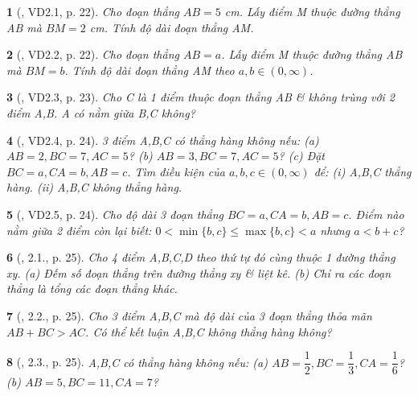 \documentclass{article}
\newtheorem{baitoan}{}
\begin{document}
\begin{baitoan}[\cite{TLCT_THCS_Toan_6_hinh_hoc}, VD2.1, p. 22]
	Cho đoạn thẳng $AB = 5$ {\rm cm}. Lấy điểm M thuộc đường thẳng AB mà $BM = 2$ {\rm cm}. Tính độ dài đoạn thẳng AM.
\end{baitoan}

\begin{baitoan}[\cite{TLCT_THCS_Toan_6_hinh_hoc}, VD2.2, p. 22]
	Cho đoạn thẳng $AB = a$. Lấy điểm M thuộc đường thẳng AB mà $BM = b$. Tính độ dài đoạn thẳng AM theo $a,b\in(0,\infty)$.
\end{baitoan}

\begin{baitoan}[\cite{TLCT_THCS_Toan_6_hinh_hoc}, VD2.3, p. 23]
	Cho C là 1 điểm thuộc đoạn thẳng AB \& không trùng với 2 điểm A,B. A có nằm giữa B,C không?
\end{baitoan}

\begin{baitoan}[\cite{TLCT_THCS_Toan_6_hinh_hoc}, VD2.4, p. 24]
	3 điểm A,B,C có thẳng hàng không nếu: (a) $AB = 2,BC = 7,AC = 5$? (b) $AB = 3,BC = 7,AC = 5$? (c) Đặt $BC = a,CA = b,AB = c$. Tìm điều kiện của $a,b,c\in(0,\infty)$ để: (i) A,B,C thẳng hàng. (ii) A,B,C không thẳng hàng.
\end{baitoan}

\begin{baitoan}[\cite{TLCT_THCS_Toan_6_hinh_hoc}, VD2.5, p. 24]
	Cho độ dài 3 đoạn thẳng $BC = a,CA = b,AB = c$. Điểm nào nằm giữa 2 điểm còn lại biết: $0 < \min\{b,c\}\le\max\{b,c\} < a$ nhưng $a < b + c$?
\end{baitoan}

\begin{baitoan}[\cite{TLCT_THCS_Toan_6_hinh_hoc}, 2.1., p. 25]
	Cho 4 điểm A,B,C,D theo thứ tự đó cùng thuộc 1 đường thẳng xy. (a) Đếm số đoạn thẳng trên đường thẳng xy \& liệt kê. (b) Chỉ ra các đoạn thẳng là tổng các đoạn thẳng khác.
\end{baitoan}

\begin{baitoan}[\cite{TLCT_THCS_Toan_6_hinh_hoc}, 2.2., p. 25]
	Cho 3 điểm A,B,C mà độ dài của 3 đoạn thẳng thỏa mãn $AB + BC > AC$. Có thể kết luận A,B,C không thẳng hàng không?
\end{baitoan}

\begin{baitoan}[\cite{TLCT_THCS_Toan_6_hinh_hoc}, 2.3., p. 25]
	A,B,C có thẳng hàng không nếu: (a) $AB = \dfrac{1}{2},BC = \dfrac{1}{3},CA = \dfrac{1}{6}$? (b) $AB = 5,BC = 11,CA = 7$?
\end{baitoan}
\end{document}
